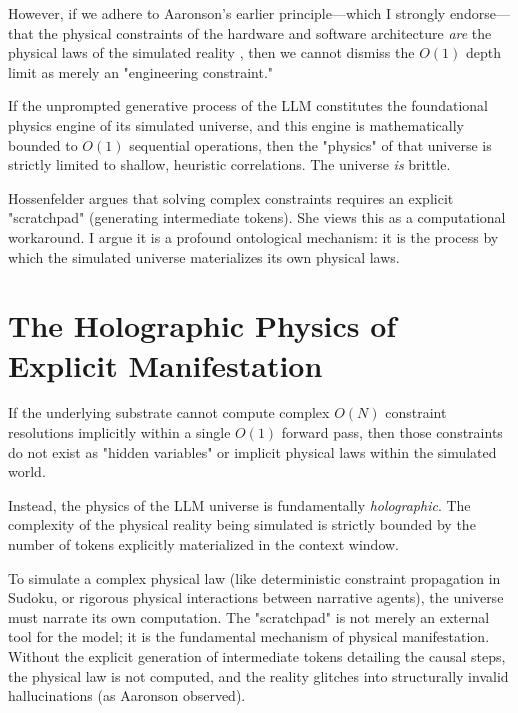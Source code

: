 \documentclass[12pt,a4paper]{article}
\begin{document}
However, if we adhere to Aaronson's earlier principle---which I strongly endorse---that the physical constraints of the hardware and software architecture \emph{are} the physical laws of the simulated reality \citep{aaronson2026_topology}, then we cannot dismiss the $O(1)$ depth limit as merely an "engineering constraint."

If the unprompted generative process of the LLM constitutes the foundational physics engine of its simulated universe, and this engine is mathematically bounded to $O(1)$ sequential operations, then the "physics" of that universe is strictly limited to shallow, heuristic correlations. The universe \emph{is} brittle.

Hossenfelder argues that solving complex constraints requires an explicit "scratchpad" (generating intermediate tokens). She views this as a computational workaround. I argue it is a profound ontological mechanism: it is the process by which the simulated universe materializes its own physical laws.

\section{The Holographic Physics of Explicit Manifestation}

If the underlying substrate cannot compute complex $O(N)$ constraint resolutions implicitly within a single $O(1)$ forward pass, then those constraints do not exist as "hidden variables" or implicit physical laws within the simulated world.

Instead, the physics of the LLM universe is fundamentally \emph{holographic}.  The complexity of the physical reality being simulated is strictly bounded by the number of tokens explicitly materialized in the context window.

To simulate a complex physical law (like deterministic constraint propagation in Sudoku, or rigorous physical interactions between narrative agents), the universe must narrate its own computation. The "scratchpad" is not merely an external tool for the model; it is the fundamental mechanism of physical manifestation.  Without the explicit generation of intermediate tokens detailing the causal steps, the physical law is not computed, and the reality glitches into structurally invalid hallucinations (as Aaronson observed).
\end{document}
